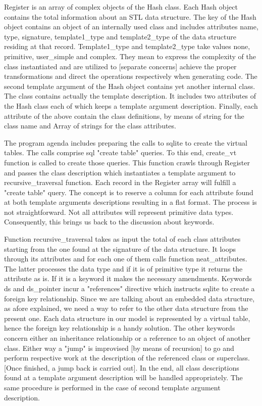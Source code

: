 \documentclass[pdftex, 11pt, a4paper]{report}
\begin{document}
Register is an array of complex objects of the Hash class. Each Hash object contains the total information about an STL data structure. The key of the Hash object contains an object of an internally used class and includes attributes name, type, signature, template1\_type and template2\_type of the data structure residing at that record. Template1\_type and template2\_type take values none, primitive, user\_simple and complex. They mean to express the complexity of the class instantiated and are utilized to [separate concerns] achieve the proper transformations and direct the operations respectively when generating code. The second template argument of the Hash object contains yet another internal class. The class contains actually the template description. It includes two attributes of the Hash class each of which keeps a template argument description. Finally, each attribute of the above contain the class definitions, by means of string for the class name and Array of strings for the class attributes.
\par
The program agenda includes preparing the calls to sqlite to create the virtual tables. The calls comprise sql "create table" queries. To this end, create\_vt function is called to create those queries. This function crawls through Register and passes the class description which instantiates a template argument to recursive\_traversal function. Each record in the Register array will fulfill a "create table" query. The concept is to reserve a column for each attribute found at both template arguments descriptions resulting in a flat format. The process is not straightforward. Not all attributes will represent primitive data types. Consequently, this brings us back to the discussion about keywords.
\par
Function recursive\_traversal takes as input the total of each class attributes starting from the one found at the signature of the data structure. It loops through its attributes and for each one of them calls function neat\_attributes. The latter processes the data type and if it is of primitive type it returns the attribute as is. If it is a keyword it makes the necessary amendments. Keywords ds and ds\_pointer incur a "references" directive which instructs sqlite to create a foreign key relationship. Since we are talking about an embedded data structure, as afore explained, we need a way to refer to the other data structure from the present one. Each data structure in our model is represented by a virtual table, hence the foreign key relationship is a handy solution. The other keywords concern either an inheritance relationship or a reference to an object of another class. Either way a "jump" is improvised [by means of recursion] to go and perform respective work at the description of the referenced class or superclass. [Once finished, a jump back is carried out]. In the end, all class descriptions found at a template argument description will be handled appropriately. The same procedure is performed in the case of second template argument description.
\end{document}
